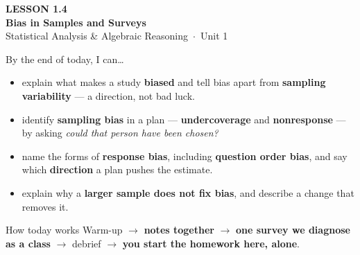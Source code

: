 \documentclass[aspectratio=169, 11pt]{beamer}
\begin{document}
{
\begin{frame}[plain]
  \vspace{2.8cm}\hspace{0.55cm}%
  \begin{minipage}{0.9\textwidth}
    {\color{goldacc}\bfseries\small LESSON 1.4}\\[0.5cm]
    {\color{white}\bfseries\LARGE Bias in Samples and Surveys}\\[1.2cm]
    {\color{frostmid}\small Statistical Analysis \& Algebraic Reasoning~$\cdot$~Unit 1}
  \end{minipage}
\end{frame}
}

\begin{frame}[t, plain]
  By the end of today, I can\ldots
  \begin{itemize}\setlength{\itemsep}{5pt}
    \item explain what makes a study \textbf{biased} and tell bias apart from \textbf{sampling
          variability} --- a direction, not bad luck.
    \item identify \textbf{sampling bias} in a plan --- \textbf{undercoverage} and
          \textbf{nonresponse} --- by asking \emph{could that person have been chosen?}
    \item name the forms of \textbf{response bias}, including \textbf{question order bias}, and
          say which \textbf{direction} a plan pushes the estimate.
    \item explain why a \textbf{larger sample does not fix bias}, and describe a change that
          removes it.
  \end{itemize}
  \begin{block}{How today works}
    Warm-up $\to$ \textbf{notes together} $\to$ \textbf{one survey we diagnose as a class} $\to$
    debrief $\to$ \textbf{you start the homework here, alone}.
  \end{block}
\end{frame}
\end{document}

